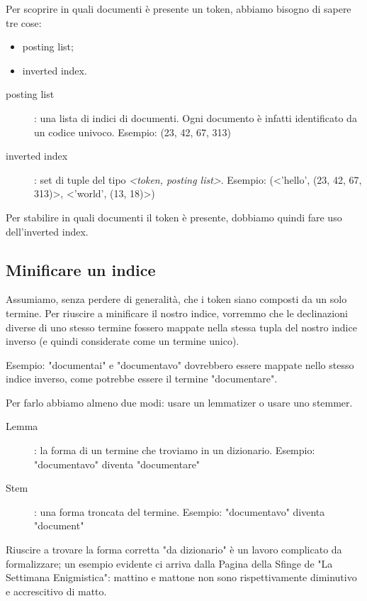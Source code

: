 Per scoprire in quali documenti è presente un token, abbiamo bisogno di sapere tre cose:
\begin{itemize}
\item posting list;
\item inverted index.
\end{itemize}

\begin{description}
    \item[posting list]: una lista di indici di documenti. Ogni documento è infatti identificato da un codice univoco. \newline{}
    Esempio: (23, 42, 67, 313)
    \item[inverted index]: set di tuple del tipo \textit{<token, posting list>}. \newline{}
    Esempio: (<'hello', (23, 42, 67, 313)>, <'world', (13, 18)>)
\end{description}

Per stabilire in quali documenti il token è presente, dobbiamo quindi fare uso dell'inverted index.


\subsection{Minificare un indice}
Assumiamo, senza perdere di generalità, che i token siano composti da un solo termine.
Per riuscire a minificare il nostro indice, vorremmo che le declinazioni diverse di uno stesso termine fossero mappate nella stessa tupla del nostro indice inverso (e quindi considerate come un termine unico).

Esempio: "documentai" e "documentavo" dovrebbero essere mappate nello stesso indice inverso, come potrebbe essere il termine "documentare".

Per farlo abbiamo almeno due modi: usare un lemmatizer o usare uno stemmer.

\begin{description}
    \item[Lemma]: la forma di un termine che troviamo in un dizionario. \newline
    Esempio: "documentavo" diventa "documentare"
    \item[Stem]: una forma troncata del termine. \newline
    Esempio: "documentavo" diventa "document"
\end{description}

Riuscire a trovare la forma corretta "da dizionario" è un lavoro complicato da formalizzare; un esempio evidente ci arriva dalla Pagina della Sfinge de "La Settimana Enigmistica": mattino e mattone non sono rispettivamente diminutivo e accrescitivo di matto.

